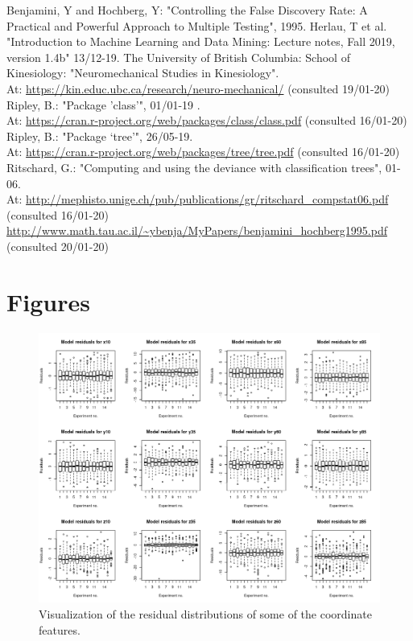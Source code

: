 \documentclass[11pt,fleqn]{article}
\begin{document}
\newpage
\begin{thebibliography}{9}
	 Benjamini, Y and Hochberg, Y: "Controlling the False Discovery Rate: A Practical and Powerful Approach to Multiple Testing", 1995.
	 Herlau, T et al. "Introduction to Machine Learning and Data Mining: Lecture notes, Fall 2019, version 1.4b" 13/12-19.
		 The University of British Columbia: School of Kinesiology:
	"Neuromechanical Studies in Kinesiology". \\
	At:
	\url{https://kin.educ.ubc.ca/research/neuro-mechanical/} (consulted 19/01-20)
	 Ripley, B.: "Package ’class’", 01/01-19 .\\
	At:
	\url{https://cran.r-project.org/web/packages/class/class.pdf} (consulted 16/01-20)
	 Ripley, B.: "Package ‘tree’", 26/05-19.\\ At: \url{https://cran.r-project.org/web/packages/tree/tree.pdf} (consulted 16/01-20)
	 Ritschard, G.: "Computing and using the deviance with classification trees", 01-06.\\
	 At:
	\url{http://mephisto.unige.ch/pub/publications/gr/ritschard_compstat06.pdf} (consulted 16/01-20)
	\url{http://www.math.tau.ac.il/~ybenja/MyPapers/benjamini_hochberg1995.pdf} (consulted 20/01-20)

\end{thebibliography}
\appendix
\newpage 
\section{Figures}

\begin{figure}[H]
	\centering
	\includegraphics[width=\linewidth]{var_experio}
	\caption{Visualization of the residual distributions of some of the coordinate features. }
	\label{fig:vars}
\end{figure}
\end{document}
